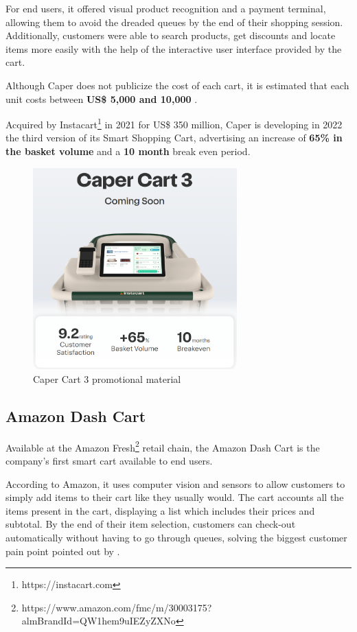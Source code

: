 \documentclass[openright]{normas-utf-tex} %
\begin{document}
For end users, it offered visual product recognition and a payment terminal,
allowing them to avoid the dreaded queues by the end of their shopping session.
Additionally, customers were able to search products, get discounts and locate
items more easily with the help of the interactive user interface provided by the cart.

Although Caper does not publicize the cost of each cart, it is estimated that each unit costs between
\textbf{US\$ 5,000 and 10,000} \cite{TWP2021}.

Acquired by Instacart\footnote{https://instacart.com} in 2021 for US\$ 350 million, Caper is developing in 2022 the 
third version of its Smart Shopping Cart, advertising an increase of \textbf{65\% in the basket
volume} and a \textbf{10 month} break even period.

\begin{figure}[H]
	\centering
	\includegraphics[width=0.7\textwidth]{./images/capercart3.png}
	\caption[Caper Cart 3 promotional material]{Caper Cart 3 promotional material}
	\label{fig:nextop}
\end{figure}


\subsection{Amazon Dash Cart}

Available at the Amazon Fresh\footnote{https://www.amazon.com/fmc/m/30003175?almBrandId=QW1hem9uIEZyZXNo} retail chain, the
Amazon Dash Cart is the company's first smart cart available to end users.

According to Amazon, it uses computer vision and sensors to allow customers to
simply add items to their cart like they usually would. The cart accounts all
the items present in the cart, displaying a list which includes their prices
and subtotal. By the end of their item selection, customers can check-out
automatically without having to go through queues, solving the biggest customer
pain point pointed out by \cite{Capgemini2020}.
\end{document}
